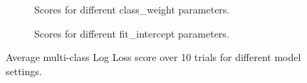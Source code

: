\begin{figure}[ht]
    \centering
    \begin{subfigure}{.45\textwidth}
        \centering
        \captionsetup{width=0.9\linewidth}
        \captionsetup{justification=centering}
        \caption{Scores for different class\_weight parameters.}
    \end{subfigure}
    \hspace{1cm}
    \begin{subfigure}{.45\textwidth}
        \centering
        \captionsetup{width=0.9\linewidth}
        \captionsetup{justification=centering}
        \caption{Scores for different fit\_intercept parameters.}
    \end{subfigure}
    \captionsetup{width=0.8\linewidth}
    \captionsetup{justification=centering}
    \caption{Average multi-class Log Loss score over 10 trials for different model settings.}
    \label{fig:2-weightfit}
\end{figure}


